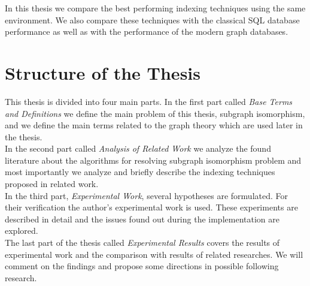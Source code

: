 In this thesis we compare the best performing indexing techniques using the same environment. We also compare these techniques with the classical SQL database performance as well as with the performance of the modern graph databases.


\section*{Structure of the Thesis}

This thesis is divided into four main parts. In the first part called \textit{Base Terms and Definitions} we define the main problem of this thesis, subgraph isomorphism, and we define the main terms related to the graph theory which are used later in the thesis.\\

In the second part called \textit{Analysis of Related Work} we analyze the found literature about the algorithms for resolving subgraph isomorphism problem and most importantly we analyze and briefly describe the indexing techniques proposed in related work.\\

In the third part, \textit{Experimental Work}, several hypotheses are formulated. For their verification the author’s experimental work is used. These experiments are described in detail and the issues found out during the implementation are explored.\\

The last part of the thesis called \textit{Experimental Results} covers the results of experimental work and the comparison with results of related researches. We will comment on the findings and propose some directions in possible following research.
